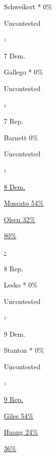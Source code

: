 Schweikert * 0\%

Uncontested

›

7 Dem.

Gallego * 0\%

Uncontested

›

7 Rep.

Barnett 0\%

Uncontested

›

\href{https://www.nytimes3xbfgragh.onion/interactive/2020/08/04/us/elections/results-arizona-house-district-8-primary-election.html}{8
Dem.}

\href{https://www.nytimes3xbfgragh.onion/interactive/2020/08/04/us/elections/results-arizona-house-district-8-primary-election.html}{
Muscato 54\% }

\href{https://www.nytimes3xbfgragh.onion/interactive/2020/08/04/us/elections/results-arizona-house-district-8-primary-election.html}{
Olsen 32\% }

\href{https://www.nytimes3xbfgragh.onion/interactive/2020/08/04/us/elections/results-arizona-house-district-8-primary-election.html}{80\%}

\href{https://www.nytimes3xbfgragh.onion/interactive/2020/08/04/us/elections/results-arizona-house-district-8-primary-election.html}{›}

8 Rep.

Lesko * 0\%

Uncontested

›

9 Dem.

Stanton * 0\%

Uncontested

›

\href{https://www.nytimes3xbfgragh.onion/interactive/2020/08/04/us/elections/results-arizona-house-district-9-primary-election.html}{9
Rep.}

\href{https://www.nytimes3xbfgragh.onion/interactive/2020/08/04/us/elections/results-arizona-house-district-9-primary-election.html}{
Giles 54\% }

\href{https://www.nytimes3xbfgragh.onion/interactive/2020/08/04/us/elections/results-arizona-house-district-9-primary-election.html}{
Huang 24\% }

\href{https://www.nytimes3xbfgragh.onion/interactive/2020/08/04/us/elections/results-arizona-house-district-9-primary-election.html}{36\%}

